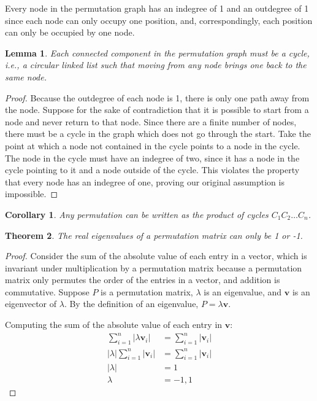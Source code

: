 \documentclass[11pt, oneside]{article}
\theoremstyle{plain}
\newtheorem{theorem}{Theorem}[section]
\newtheorem{corollary}{Corollary}[theorem]
\newtheorem{lemma}[theorem]{Lemma}
\theoremstyle{definition}
\newcommand{\ve}[1]{\mathbf{#1}}
\begin{document}
Every node in the permutation graph has an indegree of 1 and an outdegree of 1 since
each node can only occupy one position, and, correspondingly,
each position can only be occupied by one node.
\begin{lemma}
Each connected component in the permutation graph must be a cycle,
i.e., a circular linked list such that moving from any node brings
one back to the same node.
\end{lemma}
\begin{proof}
Because the outdegree of each node is 1, there is only one path away from the node.
Suppose for the sake of contradiction that it is possible to start from a node
and never return to that node. Since there are a finite number of nodes,
there must be a cycle in the graph which does not go through the start.
Take the point at which a node not contained in the cycle points to
a node in the cycle. The node in the cycle must have an indegree of two,
since it has a node in the cycle pointing to it and a node outside of the cycle.
This violates the property that every node has an indegree of one,
proving our original assumption is impossible.
\end{proof}

\begin{corollary}
Any permutation can be written as the product of cycles \( C_1 C_2 \ldots C_n \).
\end{corollary}

\begin{theorem}
The real eigenvalues of a permutation matrix can only be 1 or -1.
\end{theorem}

\begin{proof}
Consider the sum of the absolute value of each entry in a vector, which
is invariant under multiplication by a permutation matrix because
a permutation matrix only permutes the order of the entries in a vector,
and addition is commutative. Suppose \( P \) is a permutation matrix,
\( \lambda \) is an eigenvalue, and \( \ve{v} \) is an eigenvector of \( \lambda \).
By the definition of an eigenvalue, \( P = \lambda \ve{v} \).

Computing the sum of the absolute value of each entry in \( \ve{v} \):
\begin{align*}
\sum_{i=1}^n | \lambda \ve{v}_i | &= \sum_{i=1}^n | \ve{v}_i | \\
| \lambda | \sum_{i=1}^n | \ve{v}_i | &= \sum_{i=1}^n | \ve{v}_i | \\
| \lambda | &= 1 \\
\lambda &= -1, 1
\end{align*}
\end{proof}
\end{document}
